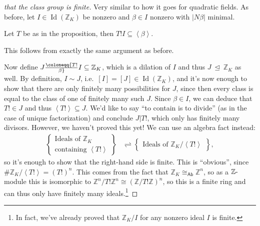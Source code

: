 \begin{proof}[that the class group is finite]

Very similar to how it goes for quadratic fields. As before, let
\(I \in \operatorname{Id}({\mathbb{Z}}_K)\) be nonzero and
\(\beta \in I\) nonzero with \({\left\lvert {N \beta} \right\rvert}\)
minimal.

\hfill\break

\begin{claim}

Let \(T\) be as in the proposition, then
\(T! I \subseteq \left\langle{ \beta }\right\rangle\).

\end{claim}

This follows from exactly the same argument as before.

\hfill\break

Now define \(J \coloneqq{T! \over \beta} I \subseteq {\mathbb{Z}}_K\),
which is a dilation of \(I\) and thus
\(J {~\trianglelefteq~}{\mathbb{Z}}_K\) as well. By definition,
\(I\sim J\), i.e.~\([I] = [J] \in \operatorname{Id}({\mathbb{Z}}_K)\),
and it's now enough to show that there are only finitely many
possibilities for \(J\), since then every class is equal to the class of
one of finitely many such \(J\). Since \(\beta\in I\), we can deduce
that \(T! \in J\) and thus
\(\left\langle{ T! }\right\rangle \subseteq J\). We'd like to say ``to
contain is to divide'' (as in the case of unique factorization) and
conclude \(J\mathrel{\Big|}T!\), which only has finitely many divisors.
However, we haven't proved this yet! We can use an algebra fact instead:
\begin{align*}
\left\{{\substack{
  \text{Ideals of ${\mathbb{Z}}_K$ }
  \\
  \text{containing } \left\langle{ T! }\right\rangle 
}}\right\}
&\rightleftharpoons
\left\{{\substack{
  \text{Ideals of } {\mathbb{Z}}_K / \left\langle{ T! }\right\rangle 
}}\right\}
,\end{align*}
so it's enough to show that the right-hand side is finite. This is
``obvious'', since
\(\# {\mathbb{Z}}_K / \left\langle{ T! }\right\rangle = (T!)^n\). This
comes from the fact that
\({\mathbb{Z}}_K \cong_{{\mathsf{Ab}}} {\mathbb{Z}}^n\), so as a
\({\mathbb{Z}}{\hbox{-}}\)module this is isomorphic to
\({\mathbb{Z}}^n / T! {\mathbb{Z}}^n \cong ({\mathbb{Z}}/T! {\mathbb{Z}})^n\),
so this is a finite ring and can thus only have finitely many
ideals.\footnote{In fact, we've already proved that
  \({\mathbb{Z}}_K / I\) for any nonzero ideal \(I\) is finite.}

\end{proof}

